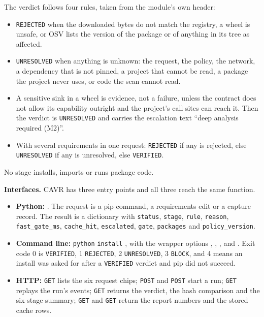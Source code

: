 The verdict follows four rules, taken from the module's own header:
\begin{sloppypar}
\begin{itemize}
    \item \texttt{REJECTED} when the downloaded bytes do not match the registry, a wheel is unsafe, or OSV lists the version of the package or of anything in its tree as affected.
    \item \texttt{UNRESOLVED} when anything is unknown: the request, the policy, the network, a dependency that is not pinned, a project that cannot be read, a package the project never uses, or code the scan cannot read.
    \item A sensitive sink in a wheel is evidence, not a failure, unless the contract does not allow its capability outright and the project's call sites can reach it. Then the verdict is \texttt{UNRESOLVED} and carries the escalation text ``deep analysis required (M2)''.
    \item With several requirements in one request: \texttt{REJECTED} if any is rejected, else \texttt{UNRESOLVED} if any is unresolved, else \texttt{VERIFIED}.
\end{itemize}
\end{sloppypar}
No stage installs, imports or runs package code.

\textbf{Interfaces.} CAVR has three entry points and all three reach the same function.
\begin{sloppypar}
\begin{itemize}
    \item \textbf{Python:} . The request is a pip command, a requirements edit or a capture record. The result is a dictionary with \texttt{status}, \texttt{stage}, \texttt{rule}, \texttt{reason}, \texttt{fast\_gate\_ms}, \texttt{cache\_hit}, \texttt{escalated}, \texttt{gate}, \texttt{packages} and \texttt{policy\_version}.
    \item \textbf{Command line:} \texttt{python}   \texttt{install} , with the wrapper options , , ,  and . Exit code 0 is \texttt{VERIFIED}, 1 \texttt{REJECTED}, 2 \texttt{UNRESOLVED}, 3 \texttt{BLOCK}, and 4 means an install was asked for after a \texttt{VERIFIED} verdict and pip did not succeed.
    \item \textbf{HTTP:} \texttt{GET}  lists the six request chips; \texttt{POST}  and \texttt{POST}  start a run; \texttt{GET}  replays the run's events; \texttt{GET}  returns the verdict, the hash comparison and the six-stage summary; \texttt{GET}  and \texttt{GET}  return the report numbers and the stored cache rows.
\end{itemize}
\end{sloppypar}

